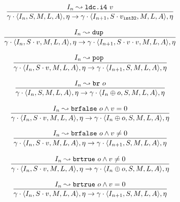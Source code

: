 \documentclass[declaration,shortabstract,english,mgr]{iithesis}
\newcommand{\mstate}[5] {
	\langle#1, #2, #3, #4, #5\rangle
}
\newcommand{\ipointsto}[3] {
	#1 \leadsto \texttt{#2} \text{ } #3
}
\newcommand{\sval}[2] {
	#1_\texttt{#2}
}
\begin{document}
\begin{equation}
\label{eq:semantics_ldci4}
	\infer{
		\gamma \cdot \mstate{I_n}{S}{M}{L}{A}, \eta
			\rightarrow
		\gamma \cdot \mstate{I_{n+1}}{S \cdot \sval{v}{int32}}{M}{L}{A}, \eta
	}
	{\ipointsto{I_n}{ldc.i4}{v}}
\end{equation}

\begin{equation}
\label{eq:semantics_dup}
	\infer{
		\gamma \cdot \mstate{I_n}{S \cdot v}{M}{L}{A}, \eta
			\rightarrow
		\gamma \cdot \mstate{I_{n+1}}{S \cdot v \cdot v}{M}{L}{A}, \eta
	}
	{\ipointsto{I_n}{dup}}
\end{equation}

\begin{equation}
\label{eq:semantics_pop}
	\infer{
		\gamma \cdot \mstate{I_n}{S \cdot v}{M}{L}{A}, \eta
			\rightarrow
		\gamma \cdot \mstate{I_{n+1}}{S}{M}{L}{A}, \eta
	}
	{\ipointsto{I_n}{pop}}
\end{equation}

\begin{equation}
\label{eq:semantics_br}
	\infer{
		\gamma \cdot \mstate{I_n}{S}{M}{L}{A}, \eta
			\rightarrow
		\gamma \cdot \mstate{I_{n} \oplus o}{S}{M}{L}{A}, \eta
	}
	{\ipointsto{I_n}{br}{o}}
\end{equation}

\begin{equation}
\label{eq:semantics_brfalse1}
	\infer{
		\gamma \cdot \mstate{I_n}{S \cdot v}{M}{L}{A}, \eta
			\rightarrow
		\gamma \cdot \mstate{I_{n} \oplus o}{S}{M}{L}{A}, \eta
	}
	{\ipointsto{I_n}{brfalse}{o} \land v = 0}
\end{equation}

\begin{equation}
\label{eq:semantics_brfalse2}
	\infer{
		\gamma \cdot \mstate{I_n}{S \cdot v}{M}{L}{A}, \eta
			\rightarrow
		\gamma \cdot \mstate{I_{n+1}}{S}{M}{L}{A}, \eta
	}
	{\ipointsto{I_n}{brfalse}{o} \land v \neq 0}
\end{equation}

\begin{equation}
\label{eq:semantics_brtrue1}
	\infer{
		\gamma \cdot \mstate{I_n}{S \cdot v}{M}{L}{A}, \eta
			\rightarrow
		\gamma \cdot \mstate{I_{n} \oplus o}{S}{M}{L}{A}, \eta
	}
	{\ipointsto{I_n}{brtrue}{o} \land v \neq 0}
\end{equation}

\begin{equation}
\label{eq:semantics_brtrue2}
	\infer{
		\gamma \cdot \mstate{I_n}{S \cdot v}{M}{L}{A}, \eta
			\rightarrow
		\gamma \cdot \mstate{I_{n+1}}{S}{M}{L}{A}, \eta
	}
	{\ipointsto{I_n}{brtrue}{o} \land v = 0}
\end{equation}
\end{document}
